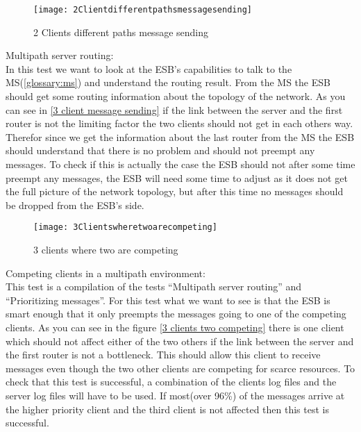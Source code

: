     \begin{figure}[h]
        \centering
        \texttt{[image: 2Clientdifferentpathsmessagesending]}
        \caption{2 Clients different paths message sending}
        \label{fig:2 Clients different paths message sending}
    \end{figure}
    
    Multipath server routing:\\
    In this test we want to look at the ESB’s capabilities to talk to the MS(\ref{glossary:ms}) and understand the routing result. From the MS the ESB should get some routing information about the topology of the network. As you can see in \ref{3 client message sending} if the link between the server and the first router is not the limiting factor the two clients should not get in each others way. Therefor since we get the information about the last router from the MS the ESB should understand that there is no problem and should not preempt any messages. To check if this is actually the case the ESB should not after some time preempt any messages, the ESB will need some time to adjust as it does not get the full picture of the network topology, but after this time no messages should be dropped from the ESB’s side.

    \begin{figure}[h]
        \centering
        \texttt{[image: 3Clientswheretwoarecompeting]}
        \caption{3 clients where two are competing}
        \label{fig:3 clients where two are competing}
    \end{figure}

    Competing clients in a multipath environment:\\
    This test is a compilation of the tests “Multipath server routing” and “Prioritizing messages”. For this test what we want to see is that the ESB is smart enough that it only preempts the messages going to one of the competing clients. As you can see in the figure \ref{3 clients two competing} there is one client which should not affect either of the two others if the link between the server and the first router is not a bottleneck. This should allow this client to receive messages even though the two other clients are competing for scarce resources. To check that this test is successful, a combination of the clients log files and the server log files will have to be used. If most(over 96\%) of the messages arrive at the higher priority client and the third client is not affected then this test is successful.

